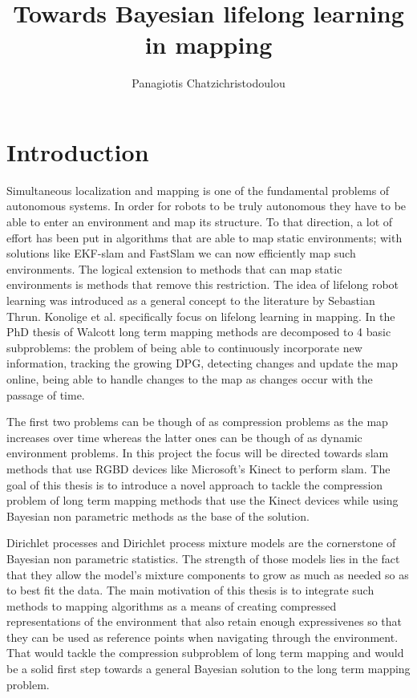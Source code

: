 \documentclass[]{article}
\title{\vspace{-2.0cm}Towards Bayesian lifelong learning in mapping}
\author{Panagiotis Chatzichristodoulou}
\date{}
\begin{document}
\maketitle %


\section{Introduction}

Simultaneous localization and mapping is one of the fundamental problems of autonomous systems\cite{probRobs}. In order for robots to be truly autonomous they have to be able to enter an environment and map its structure. To that direction, a lot of effort has been put in algorithms that are able to map static environments; with solutions like EKF-slam\cite{ekf} and FastSlam\cite{slam} we can now efficiently map such environments. 
The logical extension to methods that can map static environments is methods that remove this restriction. The idea of lifelong robot learning was introduced as a general concept to the literature by Sebastian Thrun\cite{liflonglearning}. Konolige et al.\cite{lifelongmaps} specifically focus on lifelong learning in mapping. In the PhD thesis of Walcott\cite{aishalong} long term mapping methods are decomposed to 4 basic subproblems: the problem of being able to continuously incorporate new information, tracking the growing DPG, detecting changes and update the map online, being able to handle changes to the map as changes occur with the passage of time.

The first two problems can be though of as compression problems as the map increases over time whereas the latter ones can be though of as dynamic environment problems. In this project the focus will be directed towards slam methods that use RGBD devices like Microsoft's Kinect to perform slam. The goal of this thesis is to introduce a novel approach to tackle the compression problem of long term mapping methods that use the Kinect devices while using Bayesian non parametric methods as the base of the solution.

Dirichlet processes and Dirichlet process mixture models\cite{nonParam} are the cornerstone of Bayesian non parametric statistics. The strength of those models lies in the fact that they allow the model's mixture components to grow as much as needed so as to best fit the data. The main motivation of this thesis is to integrate such methods to mapping algorithms as a means of creating compressed representations of the environment that also retain enough expressivenes so that they can be used as reference points when navigating through the environment. That would tackle the compression subproblem of long term mapping and would be a solid first step towards a general Bayesian solution to the long term mapping problem.
\end{document}
